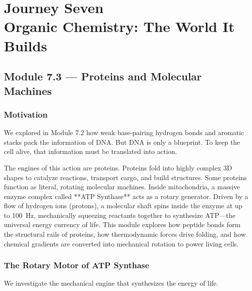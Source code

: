\documentclass[12pt, a4paper]{book}
\begin{document}
\setcounter{chapter}{6}
\chapter[Journey 7 --- Organic Chemistry: The World It Builds]
        {Journey Seven\\[8pt]
         \textcolor{ModuleColor}{\large Organic Chemistry: The World It Builds}}
\setcounter{section}{2}

\section{Module 7.3 --- Proteins and Molecular Machines}
\label{sec:mod7.3}

\subsection*{Motivation}

We explored in Module 7.2 how weak base-pairing hydrogen bonds and aromatic stacks pack the information of DNA.
But DNA is only a blueprint. To keep the cell alive, that information must be translated into action.

The engines of this action are proteins.
Proteins fold into highly complex 3D shapes to catalyze reactions, transport cargo, and build structures.
Some proteins function as literal, rotating molecular machines.
Inside mitochondria, a massive enzyme complex called **ATP Synthase** acts as a rotary generator.
Driven by a flow of hydrogen ions (protons), a molecular shaft spins inside the enzyme at up to \SI{100}{Hz}, mechanically squeezing reactants together to synthesize ATP—the universal energy currency of life.
This module explores how peptide bonds form the structural rails of proteins, how thermodynamic forces drive folding, and how chemical gradients are converted into mechanical rotation to power living cells.

\subsection{The Rotary Motor of ATP Synthase}

We investigate the mechanical engine that synthesizes the energy of life.
\end{document}
